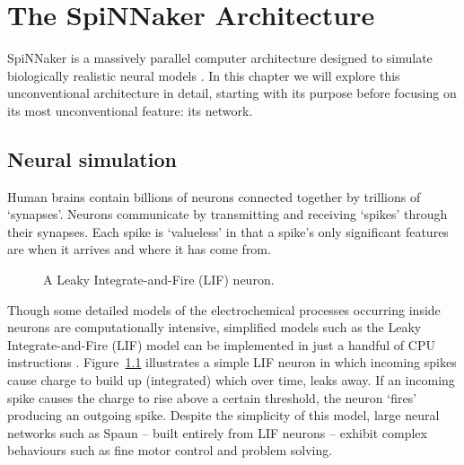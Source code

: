 \chapter{The SpiNNaker Architecture}
	
	\label{sec:background}
	
	SpiNNaker is a massively parallel computer architecture designed to simulate
	biologically realistic neural models \cite{furber07}. In this chapter we will
	explore this unconventional architecture in detail, starting with its purpose
	before focusing on its most unconventional feature: its network.
	
	
	\section{Neural simulation}
		
		Human brains contain billions of neurons connected together by trillions of
		`synapses'. Neurons communicate by transmitting and receiving `spikes'
		through their synapses. Each spike is `valueless' in that a spike's only
		significant features are when it arrives and where it has come from.
		
		\begin{figure}
			\center
			
			\caption{A Leaky Integrate-and-Fire (LIF) neuron.}
			\label{fig:lif-neuron}
		\end{figure}
		
		Though some detailed models of the electrochemical processes occurring
		inside neurons are computationally intensive, simplified models such as the
		Leaky Integrate-and-Fire (LIF) model can be implemented in just a handful
		of CPU instructions \cite{vainbrand11}. Figure~\ref{fig:lif-neuron}
		illustrates a simple LIF neuron in which incoming spikes cause charge to
		build up (integrated) which over time, leaks away. If an incoming spike
		causes the charge to rise above a certain threshold, the neuron `fires'
		producing an outgoing spike. Despite the simplicity of this model, large
		neural networks such as Spaun \cite{eliasmith12} -- built entirely from LIF
		neurons -- exhibit complex behaviours such as fine motor control and
		problem solving.
		
